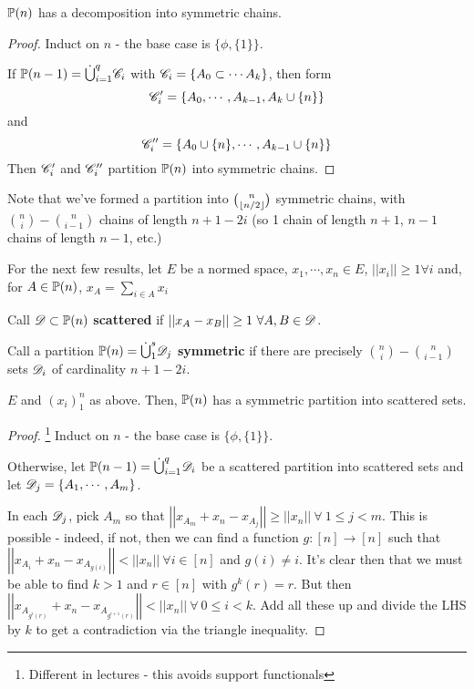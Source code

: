 \documentclass[a4paper]{article}
\begin{document}
{\begin{thm-num}
	$\P(n)$ has a decomposition into symmetric chains.
\end{thm-num}
\begin{proof}
	Induct on $n$ - the base case is $\{\phi,\{1\}\}$.
	
	If $\P(n-1)=\dot{\bigcup}_{i=1}^{q}\calC_i$ with $\calC_i = \left\{A_0\subset\cdots A_k\right\}$, then form $$\calC_i'=\left\{A_0,\cdots,A_{k-1},A_k\cup\{n\}\right\}$$
	and $$\calC_i''=\left\{A_0\cup\{n\},\cdots,A_{k-1}\cup\{n\}\right\}$$
	Then $\calC_i'$ and $\calC_i''$ partition $\P(n)$ into symmetric chains.
\end{proof}
\begin{rem}
	Note that we've formed a partition into $\binom{n}{\lf n/2\rf}$ symmetric chains, with $\binom{n}{i}-\binom{n}{i-1}$ chains of length $n+1-2i$ (so 1 chain of length $n+1$, $n-1$ chains of length $n-1$, etc.)
\end{rem}

For the next few results, let $E$ be a normed space, $x_1,\cdots, x_n\in E$, $\left|\left|x_i\right|\right|\geq 1\forall i$ and, for $A\in\P(n)$, $x_A=\sum_{i\in A}x_i$

\begin{defi}[Scattered]
	Call $\calD\subset\P(n)$ \textbf{scattered} if $\left|\left|x_A - x_B\right|\right|\geq1\ \forall A, B\in \calD$.
\end{defi}

\begin{defi}
	Call a partition $\P(n)=\dot{\bigcup}_1^s\calD_j$ \textbf{symmetric} if there are precisely $\binom{n}{i}-\binom{n}{i-1}$ sets $\calD_i$ of cardinality $n+1-2i$.
\end{defi}

\begin{thm-num}[Kleitman, 1970]
	$E$ and $(x_i)_1^n$ as above. Then, $\P(n)$ has a symmetric partition into scattered sets.
\end{thm-num}
\begin{proof}\footnote{Different in lectures - this avoids support functionals}
	Induct on $n$ - the base case is $\{\phi,\{1\}\}$.
	
	Otherwise, let $\P(n-1)=\dot{\bigcup}_{i=1}^{q}\calD_i$ be a scattered partition into scattered sets and let $\calD_j=\{A_1,\cdots,A_m\}$.
	
	In each $\calD_j$, pick $A_m$ so that $\left|\left|x_{A_m} + x_n - x_{A_j}\right|\right|\geq \left|\left|x_n\right|\right|\ \forall\ 1\leq j<m$. This is possible - indeed, if not, then we can find a function $g:[n]\rightarrow[n]$ such that $\left|\left|x_{A_i} + x_n - x_{A_{g(i)}}\right|\right|< \left|\left|x_n\right|\right|\ \forall i\in[n]$ and $g(i)\neq i$. It's clear then that we must be able to find $k>1$ and $r\in[n]$ with $g^k(r)=r$. But then $\left|\left|x_{A_{g^i(r)}} + x_n - x_{A_{g^{i+1}(r)}}\right|\right|< \left|\left|x_n\right|\right|\ \forall\ 0\leq i<k$. Add all these up and divide the LHS by $k$ to get a contradiction via the triangle inequality.
	

\end{proof}}
\end{document}
